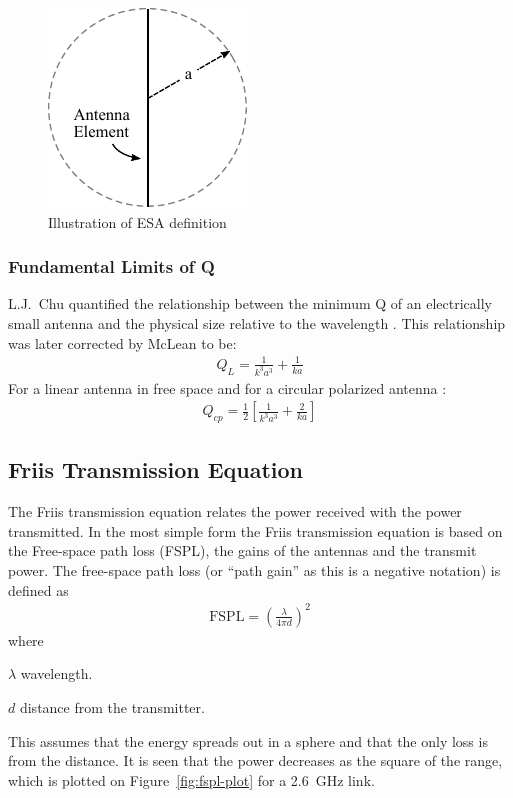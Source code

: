 \begin{figure}[htbp]
  \centering
  \includegraphics[scale=1]{img/analysis/ESA}
  \caption{Illustration of ESA definition \cite{}}
  \label{fig:ant-esa-def}
\end{figure}

\subsubsection{Fundamental Limits of Q}
\label{sec:fun_lim}
L.J.\ Chu quantified the relationship between the minimum Q of an electrically small antenna and the physical size relative to the wavelength \cite{chu1948}. This relationship was later corrected by McLean \cite{mclean1996} to be: 
\begin{align}
  Q_L = \frac{1}{k^3a^3}+ \frac{1}{ka}
\end{align}
For a linear antenna in free space and for a circular polarized antenna \cite{mclean1996}:
\begin{align}
  Q_{cp} = \frac{1}{2}  \left[ \frac{1}{k^3a^3} + \frac{2}{ka} \right] 
\end{align}

\subsection{Friis Transmission Equation}
The Friis transmission equation relates the power received with the power transmitted. In the most simple form the Friis transmission equation is based on the Free-space path loss (FSPL), the gains of the antennas and the transmit power. The free-space path loss (or ``path gain'' as this is a negative notation) is defined as \cite{balanis2012antenna}
\begin{align}
  \label{eq:fspl}
  \text{FSPL} = \left( \frac{\lambda}{4 \pi d} \right)^2 
\end{align}
where
\begin{where}
\item[$\lambda$] wavelength.
\item[$d$] distance from the transmitter.
\end{where}
This assumes that the energy spreads out in a sphere and that the only loss is from the distance. It is seen that the power decreases as the square of the range, which is plotted on Figure~\ref{fig:fspl-plot} for a \SI{2.6}{GHz} link.

